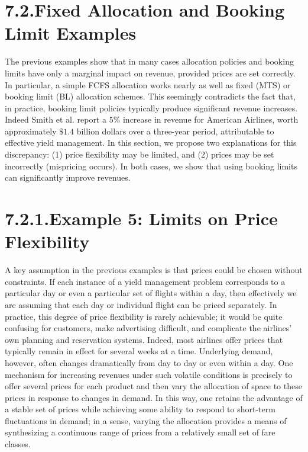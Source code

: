 \section{7.2.Fixed Allocation and Booking Limit Examples}\label{fixed-allocation-and-booking-limit-examples}

The previous examples show that in many cases allocation policies and booking limits have only a marginal impact on revenue, provided prices are set correctly. In particular, a simple FCFS allocation works nearly as well as fixed (MTS) or booking limit (BL) allocation schemes. This seemingly contradicts the fact that, in practice, booking limit policies typically produce significant revenue increases. Indeed Smith et al. report a \(5\%\) increase in revenue for American Airlines, worth approximately \(\$1.4\) billion dollars over a three-year period, attributable to effective yield management. In this section, we propose two explanations for this discrepancy: (1) price flexibility may be limited, and (2) prices may be set incorrectly (mispricing occurs). In both cases, we show that using booking limits can significantly improve revenues.

\section{7.2.1.Example 5: Limits on Price Flexibility}\label{limits-on-price-flexibility}

A key assumption in the previous examples is that prices could be chosen without constraints. If each instance of a yield management problem corresponds to a particular day or even a particular set of flights within a day, then effectively we are assuming that each day or individual flight can be priced separately. In practice, this degree of price flexibility is rarely achievable; it would be quite confusing for customers, make advertising difficult, and complicate the airlines' own planning and reservation systems. Indeed, most airlines offer prices that typically remain in effect for several weeks at a time. Underlying demand, however, often changes dramatically from day to day or even within a day. One mechanism for increasing revenues under such volatile conditions is precisely to offer several prices for each product and then vary the allocation of space to these prices in response to changes in demand. In this way, one retains the advantage of a stable set of prices while achieving some ability to respond to short-term fluctuations in demand; in a sense, varying the allocation provides a means of synthesizing a continuous range of prices from a relatively small set of fare classes.

